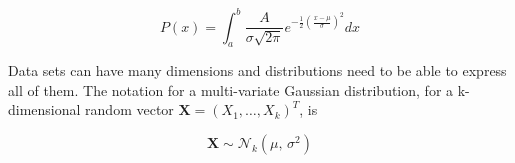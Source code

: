 \begin{equation}
    P(x) = \int_{a}^{b}\frac{A}{\sigma\sqrt{2\pi}}e^{-\frac{1}{2}(\frac{x-\mu}{\sigma})^2}dx
    \label{eq:gausseg}
\end{equation}

Data sets can have many dimensions and distributions need to be able to express all of them. The notation for a multi-variate Gaussian distribution, for a k-dimensional random vector $ \bm{X} = (X_1,\hdots,X_k)^T$, is

\begin{equation}
    \bm{X} \sim \mathcal{N}_k(\mu,\,\sigma^{2})
\label{eq:multigauss}
\end{equation}







  
  
